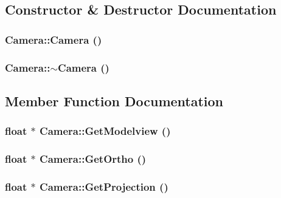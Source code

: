 \subsection{Constructor \& Destructor Documentation}
\hypertarget{class_camera_01f94c3543f56ede7af49dc778f19331}{
\subsubsection[{Camera}]{\setlength{\rightskip}{0pt plus 5cm}Camera::Camera ()}}
\label{class_camera_01f94c3543f56ede7af49dc778f19331}


\hypertarget{class_camera_d1897942d0ccf91052386388a497349f}{
\subsubsection[{$\sim$Camera}]{\setlength{\rightskip}{0pt plus 5cm}Camera::$\sim$Camera ()}}
\label{class_camera_d1897942d0ccf91052386388a497349f}




\subsection{Member Function Documentation}
\hypertarget{class_camera_e9be306be54cbdaf385df04e25955ae7}{
\subsubsection[{GetModelview}]{\setlength{\rightskip}{0pt plus 5cm}float $\ast$ Camera::GetModelview ()}}
\label{class_camera_e9be306be54cbdaf385df04e25955ae7}


\hypertarget{class_camera_0e9143e16c94bdecf0ca5935a8fe44e7}{
\subsubsection[{GetOrtho}]{\setlength{\rightskip}{0pt plus 5cm}float $\ast$ Camera::GetOrtho ()}}
\label{class_camera_0e9143e16c94bdecf0ca5935a8fe44e7}


\hypertarget{class_camera_76150532e30d85a51c8abd28cde37628}{
\subsubsection[{GetProjection}]{\setlength{\rightskip}{0pt plus 5cm}float $\ast$ Camera::GetProjection ()}}
\label{class_camera_76150532e30d85a51c8abd28cde37628}


